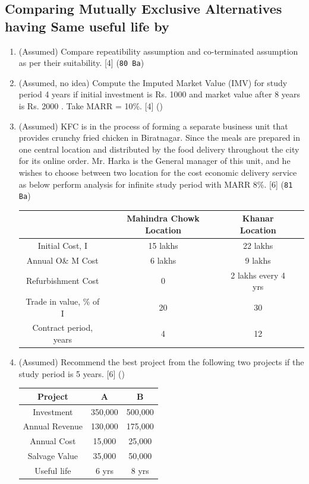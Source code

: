 \documentclass[12pt]{article}
\begin{document}
	\subsection{Comparing Mutually Exclusive Alternatives having Same useful life by}
	\begin{enumerate}[noitemsep, topsep=0pt]
		\item (Assumed) Compare repeatibility assumption and co-terminated assumption as per their suitability. \hspace{14.4cm} [4] (\texttt{80 Ba})
		
		\item (Assumed, no idea) Compute the Imputed Market Value (IMV) for study period 4 years if initial investment is Rs. 1000 and market value after 8 years is Rs. 2000 . Take MARR = 10\%. \hfill [4] ()
		
		\item (Assumed) KFC is in the process of forming a separate business unit that provides crunchy fried chicken in Biratnagar. Since the meals are prepared in one central location and distributed by the food delivery throughout the city for its online order. Mr. Harka is the General manager of this unit, and he wishes to choose between two location for the cost economic delivery service as below perform analysis for infinite study period with MARR 8\%. \hfill [6] (\texttt{81 Ba})\\
		\begin{tabular}{|c|c|c|c|}
			\hline
			& Mahindra Chowk Location & Khanar Location \\ \hline
			Initial Cost, I & 15 lakhs & 22 lakhs \\ \hline
			Annual O\& M Cost & 6 lakhs & 9 lakhs \\ \hline
			Refurbishment Cost & 0 & 2 lakhs every 4 yrs \\ \hline
			Trade in value, \% of I & 20 & 30 \\ \hline
			Contract period, years & 4 & 12 \\ \hline
		\end{tabular}
		
		\item (Assumed) Recommend the best project from the following two projects if the study period is 5 years. \hfill [6] ()\\
		\begin{tabular}{|c|c|c|}
			\hline
			Project & A & B \\ \hline
			Investment & 350,000 & 500,000 \\ \hline
			Annual Revenue & 130,000 & 175,000 \\ \hline
			Annual Cost & 15,000 & 25,000 \\ \hline
			Salvage Value & 35,000 & 50,000 \\ \hline
			Useful life & 6 yrs & 8 yrs \\ \hline
		\end{tabular}\\
	\end{enumerate}
\end{document}
